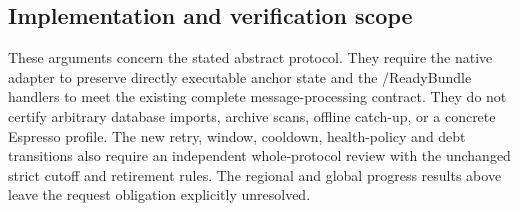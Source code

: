 \subsection{Implementation and verification scope}
\label{sec:v35-progress-scope}
These arguments concern the stated abstract protocol. They require the
native adapter to preserve directly executable anchor state and the
/ReadyBundle handlers to meet the existing complete
message-processing contract. They do not certify arbitrary database
imports, archive scans, offline catch-up, or a concrete Espresso profile.
The new retry, window, cooldown, health-policy and debt transitions also
require an independent whole-protocol review with the unchanged strict
cutoff and retirement rules. The regional and global progress results
above leave the request obligation explicitly unresolved.
